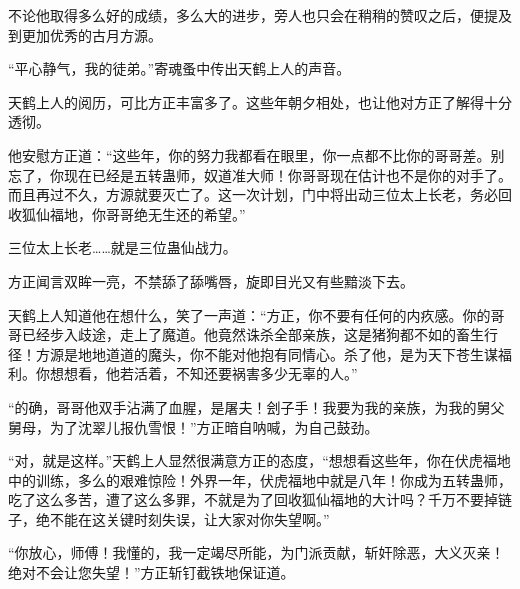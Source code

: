 \begin{this_body}
不论他取得多么好的成绩，多么大的进步，旁人也只会在稍稍的赞叹之后，便提及到更加优秀的古月方源。

“平心静气，我的徒弟。”寄魂蚤中传出天鹤上人的声音。

天鹤上人的阅历，可比方正丰富多了。这些年朝夕相处，也让他对方正了解得十分透彻。

他安慰方正道：“这些年，你的努力我都看在眼里，你一点都不比你的哥哥差。别忘了，你现在已经是五转蛊师，奴道准大师！你哥哥现在估计也不是你的对手了。而且再过不久，方源就要灭亡了。这一次计划，门中将出动三位太上长老，务必回收狐仙福地，你哥哥绝无生还的希望。”

三位太上长老……就是三位蛊仙战力。

方正闻言双眸一亮，不禁舔了舔嘴唇，旋即目光又有些黯淡下去。

天鹤上人知道他在想什么，笑了一声道：“方正，你不要有任何的内疚感。你的哥哥已经步入歧途，走上了魔道。他竟然诛杀全部亲族，这是猪狗都不如的畜生行径！方源是地地道道的魔头，你不能对他抱有同情心。杀了他，是为天下苍生谋福利。你想想看，他若活着，不知还要祸害多少无辜的人。”

“的确，哥哥他双手沾满了血腥，是屠夫！刽子手！我要为我的亲族，为我的舅父舅母，为了沈翠儿报仇雪恨！”方正暗自呐喊，为自己鼓劲。

“对，就是这样。”天鹤上人显然很满意方正的态度，“想想看这些年，你在伏虎福地中的训练，多么的艰难惊险！外界一年，伏虎福地中就是八年！你成为五转蛊师，吃了这么多苦，遭了这么多罪，不就是为了回收狐仙福地的大计吗？千万不要掉链子，绝不能在这关键时刻失误，让大家对你失望啊。”

“你放心，师傅！我懂的，我一定竭尽所能，为门派贡献，斩奸除恶，大义灭亲！绝对不会让您失望！”方正斩钉截铁地保证道。

\end{this_body}

